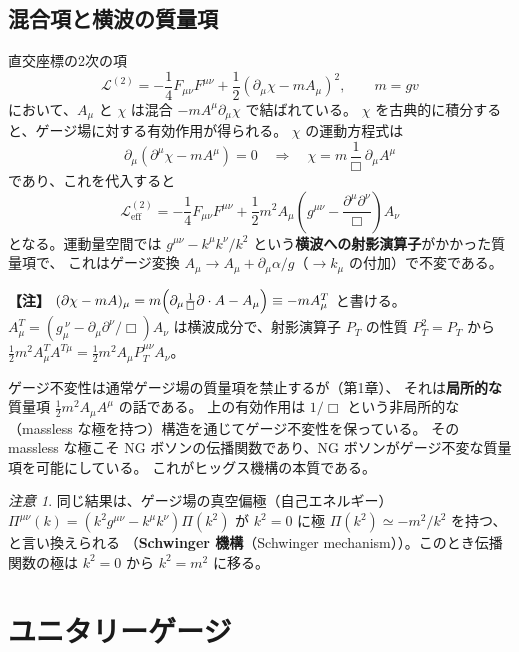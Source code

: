 \documentclass[uplatex,dvipdfmx,a4paper,11pt,openany]{jsbook}
\newcommand{\term}[2]{\textbf{#1}（#2）}
\newenvironment{note}{\vspace{1ex}\par\footnotesize\noindent\textbf{【注】}}{\par\vspace{1ex}}
\numberwithin{equation}{chapter}
\theoremstyle{definition}
\theoremstyle{plain}
\theoremstyle{remark}
\newtheorem{remark}{注意}[chapter]
\newcommand{\Lag}{\mathcal{L}}
\begin{document}
\subsection{混合項と横波の質量項}
直交座標の2次の項
\begin{equation}
\Lag^{(2)}=-\frac14F_{\mu\nu}F^{\mu\nu}+\frac12(\partial_\mu\chi-mA_\mu)^2,\qquad m=gv
\label{eq:quadratic-mixing}
\end{equation}
において、$A_\mu$ と $\chi$ は混合 $-mA^\mu\partial_\mu\chi$ で結ばれている。
$\chi$ を古典的に積分すると、ゲージ場に対する有効作用が得られる。
$\chi$ の運動方程式は
\begin{equation}
\partial_\mu(\partial^\mu\chi-mA^\mu)=0\quad\Longrightarrow\quad\chi=m\,\frac{1}{\Box}\,\partial_\mu A^\mu
\end{equation}
であり、これを代入すると
\begin{equation}
\Lag^{(2)}_{\mathrm{eff}}=-\frac14F_{\mu\nu}F^{\mu\nu}+\frac12m^2A_\mu\left(g^{\mu\nu}-\frac{\partial^\mu\partial^\nu}{\Box}\right)A_\nu
\end{equation}
となる。運動量空間では $g^{\mu\nu}-k^\mu k^\nu/k^2$ という\textbf{横波への射影演算子}がかかった質量項で、
これはゲージ変換 $A_\mu\to A_\mu+\partial_\mu\alpha/g$（$\to k_\mu$ の付加）で不変である。
\begin{note}
$(\partial\chi-mA)_\mu=m\Bigl(\partial_\mu\frac1\Box\partial\cdot A-A_\mu\Bigr)\equiv-mA^T_\mu$ と書ける。
$A^T_\mu=(g_\mu^{\ \nu}-\partial_\mu\partial^\nu/\Box)A_\nu$ は横波成分で、射影演算子 $P_T$ の性質 $P_T^2=P_T$ から
$\frac12m^2A^T_\mu A^{T\mu}=\frac12m^2A_\mu P_T^{\mu\nu}A_\nu$。
\end{note}
ゲージ不変性は通常ゲージ場の質量項を禁止するが（第1章）、
それは\textbf{局所的な}質量項 $\frac12m^2A_\mu A^\mu$ の話である。
上の有効作用は $1/\Box$ という非局所的な（massless な極を持つ）構造を通じてゲージ不変性を保っている。
その massless な極こそ NG ボソンの伝播関数であり、NG ボソンがゲージ不変な質量項を可能にしている。
これがヒッグス機構の本質である。
\begin{remark}
同じ結果は、ゲージ場の真空偏極（自己エネルギー）$\Pi^{\mu\nu}(k)=(k^2g^{\mu\nu}-k^\mu k^\nu)\Pi(k^2)$ が
$k^2=0$ に極 $\Pi(k^2)\simeq-m^2/k^2$ を持つ、と言い換えられる
（\term{Schwinger 機構}{Schwinger mechanism}）。このとき伝播関数の極は $k^2=0$ から $k^2=m^2$ に移る。
\end{remark}
\section{ユニタリーゲージ}
\label{sec:unitary-gauge}
\end{document}
